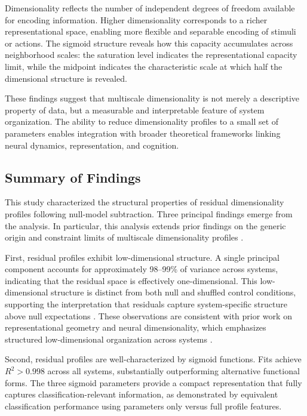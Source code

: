 \documentclass[11pt]{article}
\begin{document}
Dimensionality reflects the number of independent degrees of freedom available for encoding information. Higher dimensionality corresponds to a richer representational space, enabling more flexible and separable encoding of stimuli or actions. The sigmoid structure reveals how this capacity accumulates across neighborhood scales: the saturation level indicates the representational capacity limit, while the midpoint indicates the characteristic scale at which half the dimensional structure is revealed.

These findings suggest that multiscale dimensionality is not merely a descriptive property of data, but a measurable and interpretable feature of system organization. The ability to reduce dimensionality profiles to a small set of parameters enables integration with broader theoretical frameworks linking neural dynamics, representation, and cognition.

\subsection{Summary of Findings}

This study characterized the structural properties of residual dimensionality profiles following null-model subtraction. Three principal findings emerge from the analysis. In particular, this analysis extends prior findings on the generic origin and constraint limits of multiscale dimensionality profiles \citep{paper3, paper4}.

First, residual profiles exhibit low-dimensional structure. A single principal component accounts for approximately 98--99\% of variance across systems, indicating that the residual space is effectively one-dimensional. This low-dimensional structure is distinct from both null and shuffled control conditions, supporting the interpretation that residuals capture system-specific structure above null expectations \citep{levina2005maximum, jolliffe2002principal}. These observations are consistent with prior work on representational geometry and neural dimensionality, which emphasizes structured low-dimensional organization across systems \citep{kriegeskorte2013representational, cunningham2014dimensionality}.

Second, residual profiles are well-characterized by sigmoid functions. Fits achieve $R^2 > 0.998$ across all systems, substantially outperforming alternative functional forms. The three sigmoid parameters provide a compact representation that fully captures classification-relevant information, as demonstrated by equivalent classification performance using parameters only versus full profile features.
\end{document}
